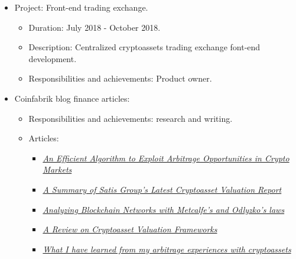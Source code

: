 \documentclass[11pt,a4paper,sans]{moderncv}        %
\begin{document}
{\begin{itemize}
\begin{itemize}
	\item Responsibilities and achievements: Decentralized platform design, including architecture, token dynamics, incentives and economics.
	\end{itemize}
\item Project: Front-end trading exchange.
	\begin{itemize}%
	\item Duration: July 2018 - October 2018.
	\item Description: Centralized cryptoassets trading exchange font-end development.
	\item Responsibilities and achievements: Product owner.
	\end{itemize}
\item Coinfabrik blog finance articles:
	\begin{itemize}%
	\item Responsibilities and achievements: research and writing.
	\item Articles:
		\begin{itemize}
		\item \href{https://blog.coinfabrik.com/an-efficient-algorithm-to-exploit-arbitrage-opportunities-in-crypto-markets/}{\textit{An Efficient Algorithm to Exploit Arbitrage Opportunities in Crypto Markets}}
		\item \href{https://blog.coinfabrik.com/a-summary-of-satis-groups-latest-cryptoasset-valuation-report/}{\textit{A Summary of Satis Group’s Latest Cryptoasset Valuation Report}}
		\item \href{https://blog.coinfabrik.com/analyzing-blockchain-networks-with-metcafes-and-odlyzkos-laws/}{\textit{Analyzing Blockchain Networks with Metcalfe’s and Odlyzko’s laws}}
		\item \href{https://blog.coinfabrik.com/a-review-on-cryptoasset-valuation-frameworks/}{\textit{A Review on Cryptoasset Valuation Frameworks}}
		\item \href{https://blog.coinfabrik.com/what-i-have-learned-from-my-arbitrage-experiences-with-cryptoassets/}{\textit{What I have learned from my arbitrage experiences with cryptoassets}}		
		\end{itemize}	
	\end{itemize}
\end{itemize}
}
\end{document}
